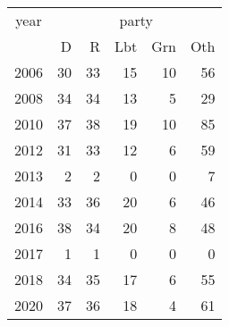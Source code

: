 \footnotesize\begin{tabular}[t]{lrrrrr}
\toprule
\multicolumn{1}{c}{year} & \multicolumn{5}{c}{party} \\
\cmidrule(l{3pt}r{3pt}){1-1} \cmidrule(l{3pt}r{3pt}){2-6}
  & D & R & Lbt & Grn & Oth\\
\midrule
2006 & 30 & 33 & 15 & 10 & 56\\
2008 & 34 & 34 & 13 & 5 & 29\\
2010 & 37 & 38 & 19 & 10 & 85\\
2012 & 31 & 33 & 12 & 6 & 59\\
2013 & 2 & 2 & 0 & 0 & 7\\
2014 & 33 & 36 & 20 & 6 & 46\\
2016 & 38 & 34 & 20 & 8 & 48\\
2017 & 1 & 1 & 0 & 0 & 0\\
2018 & 34 & 35 & 17 & 6 & 55\\
2020 & 37 & 36 & 18 & 4 & 61\\
\bottomrule
\end{tabular}
